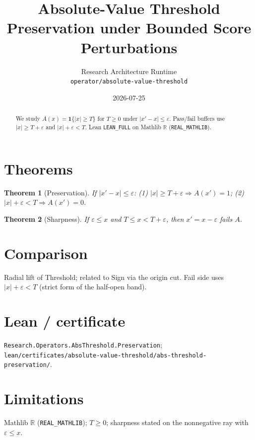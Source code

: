 \documentclass[11pt]{article}
\title{Absolute-Value Threshold Preservation under Bounded Score Perturbations}
\author{Research Architecture Runtime \\ \texttt{operator/absolute-value-threshold}}
\date{2026-07-25}
\newtheorem{theorem}{Theorem}
\begin{document}
\maketitle
\begin{abstract}
We study \(A(x)=\mathbf{1}\{\lvert x\rvert\ge T\}\) for \(T\ge 0\) under
\(\lvert x'-x\rvert\le\varepsilon\). Pass/fail buffers use
\(\lvert x\rvert\ge T+\varepsilon\) and \(\lvert x\rvert+\varepsilon<T\).
Lean \texttt{LEAN\_FULL} on Mathlib \(\mathbb{R}\) (\texttt{REAL\_MATHLIB}).
\end{abstract}
\section{Theorems}
\begin{theorem}[Preservation]
If \(\lvert x'-x\rvert\le\varepsilon\): (1) \(\lvert x\rvert\ge T+\varepsilon\Rightarrow A(x')=1\);
(2) \(\lvert x\rvert+\varepsilon<T\Rightarrow A(x')=0\).
\end{theorem}
\begin{theorem}[Sharpness]
If \(\varepsilon\le x\) and \(T\le x<T+\varepsilon\), then \(x'=x-\varepsilon\) fails \(A\).
\end{theorem}
\section{Comparison}
Radial lift of Threshold; related to Sign via the origin cut. Fail side uses
\(\lvert x\rvert+\varepsilon<T\) (strict form of the half-open band).
\section{Lean / certificate}
\texttt{Research.Operators.AbsThreshold.Preservation};
\texttt{lean/certificates/absolute-value-threshold/abs-threshold-preservation/}.
\section{Limitations}
Mathlib $\mathbb{R}$ (\texttt{REAL\_MATHLIB}); \(T\ge 0\); sharpness stated on the
nonnegative ray with \(\varepsilon\le x\).
\end{document}
